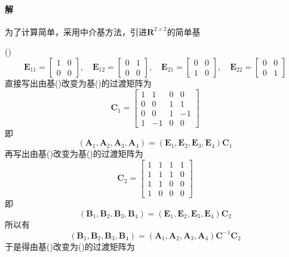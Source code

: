 \documentclass[12pt, a4paper, oneside, fontset=none]{ctexart}
\begin{document}
\paragraph*{解} 为了计算简单，采用中介基方法，引进$\mathbf{R}^{2\times 2}$的简单基\par
(\uppercase\expandafter{})
\[
    \bm{E}_{11} = \begin{bmatrix}
        1 & 0 \\
        0 & 0
    \end{bmatrix}, \quad \bm{E}_{12} = \begin{bmatrix}
        0 & 1 \\
        0 & 0
    \end{bmatrix}, \quad \bm{E}_{21} = \begin{bmatrix}
        0 & 0 \\
        1 & 0
    \end{bmatrix}, \quad \bm{E}_{22} = \begin{bmatrix}
        0 & 0 \\
        0 & 1
    \end{bmatrix}
\]
直接写出由基(\uppercase\expandafter{})改变为基(\uppercase\expandafter{})的过渡矩阵为
\[
    \bm{C}_1 = \begin{bmatrix}
        1 & 1  & 0 & 0  \\
        0 & 0  & 1 & 1  \\
        0 & 0  & 1 & -1 \\
        1 & -1 & 0 & 0
    \end{bmatrix}
\]
即
\[
    (\bm{A}_1, \bm{A}_2, \bm{A}_3, \bm{A}_4) = (\bm{E}_1, \bm{E}_2, \bm{E}_3, \bm{E}_4)\bm{C}_1
\]
再写出由基(\uppercase\expandafter{})改变为基(\uppercase\expandafter{})的过渡矩阵为
\[
    \bm{C}_2 = \begin{bmatrix}
        1 & 1 & 1 & 1 \\
        1 & 1 & 1 & 0 \\
        1 & 1 & 0 & 0 \\
        1 & 0 & 0 & 0
    \end{bmatrix}
\]
即
\[
    (\bm{B}_1, \bm{B}_2, \bm{B}_3, \bm{B}_4) = (\bm{E}_1, \bm{E}_2, \bm{E}_3, \bm{E}_4)\bm{C}_2
\]
所以有
\[
    (\bm{B}_1, \bm{B}_2, \bm{B}_3, \bm{B}_4) = (\bm{A}_1, \bm{A}_2, \bm{A}_3, \bm{A}_4)\bm{C}^{-1}\bm{C}_2
\]
于是得由基(\uppercase\expandafter{})改变为(\uppercase\expandafter{})的过渡矩阵为
\end{document}
